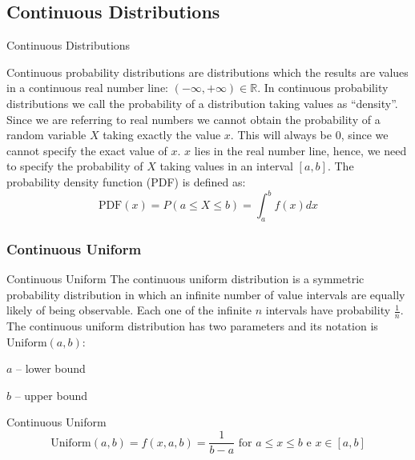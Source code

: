 
\subsection*{Continuous Distributions}
\begin{frame}[noframenumbering]{Continuous Distributions}
	\begin{defn}
		\small
		Continuous probability distributions are distributions which
		the results are values in a continuous real number line:
		$(-\infty, +\infty) \in \mathbb{R}$.
		In continuous probability distributions we call the probability
		of a distribution taking values as ``density''.
		Since we are referring to real numbers we cannot obtain the
		probability of a random variable $X$ taking exactly the value $x$.
		This will always be $0$, since we cannot specify the exact
		value of $x$. $x$ lies in the real number line, hence,
		we need to specify the probability of $X$ taking values in an
		interval $[a,b]$.
		The probability density function (PDF) is defined as:
		$$\text{PDF}(x) = P(a \leq X \leq b) = \int_a^b f(x) dx$$
	\end{defn}
\end{frame}

\subsubsection*{Continuous Uniform}
\begin{frame}[noframenumbering]{Continuous Uniform}
	The continuous uniform distribution is a symmetric probability distribution
	in which an infinite number of value intervals are equally likely of being observable.
	Each one of the infinite $n$ intervals have probability $\frac{1}{n}$.
	\vfill
	The continuous uniform distribution has two parameters and its notation is $\text{Uniform}(a, b)$:
	\begin{vfilleditems}
		\item $a$ -- lower bound
		\item $b$ -- upper bound
	\end{vfilleditems}
\end{frame}

\begin{frame}[noframenumbering]{Continuous Uniform}
	$$\text{Uniform}(a,b) = f(x, a, b) = \frac{1}{b-a} \text{ for $a \leq x \leq b$ e $x \in [a, b]$}$$
\end{frame}

